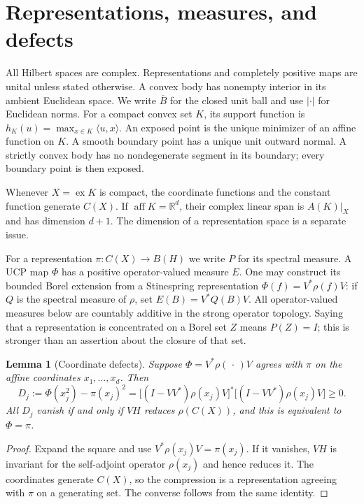 \documentclass[11pt,letterpaper]{amsart}
\newtheorem{lemma}[theorem]{Lemma}
\theoremstyle{definition}
\theoremstyle{remark}
\numberwithin{equation}{section}
\DeclareMathOperator{\ex}{ex}
\DeclareMathOperator{\aff}{aff}
\newcommand{\R}{\mathbb R}
\begin{document}
\section{Representations, measures, and defects}
\label{sec:preliminaries}

All Hilbert spaces are complex. Representations and completely positive
maps are unital unless stated otherwise. A convex body has nonempty
interior in its ambient Euclidean space. We write $\overline B$ for the
closed unit ball and use $|\cdot|$ for Euclidean norms. For a compact
convex set $K$, its support function is
$h_K(u)=\max_{x\in K}\langle u,x\rangle$. An exposed point is the
unique minimizer of an affine function on $K$. A smooth boundary point has a unique unit outward
normal. A strictly convex body has no nondegenerate segment in its
boundary; every boundary point is then exposed.

Whenever $X=\ex K$ is compact, the coordinate functions and the constant
function generate $C(X)$. If $\aff K=\R^d$, their complex linear span
is $A(K)|_X$ and has dimension $d+1$. The dimension of a representation
space is a separate issue.

For a representation $\pi:C(X)\to B(H)$ we write $P$ for its spectral
measure. A UCP map $\Phi$ has a positive operator-valued measure $E$.
One may construct its bounded Borel extension from a Stinespring
representation $\Phi(f)=V^*\rho(f)V$: if $Q$ is the spectral measure of
$\rho$, set $E(B)=V^*Q(B)V$. All operator-valued measures below are
countably additive in the strong operator topology. Saying that a
representation is concentrated on a Borel set $Z$ means $P(Z)=I$;
this is stronger than an assertion about the closure of that set.

\begin{lemma}[Coordinate defects]\label{lem:defect}
Suppose $\Phi=V^*\rho(\,\cdot\,)V$ agrees with $\pi$ on the affine
coordinates $x_1,\ldots,x_d$. Then
\[
 D_j:=\Phi(x_j^2)-\pi(x_j)^2
   =\bigl[(I-VV^*)\rho(x_j)V\bigr]^*
      \bigl[(I-VV^*)\rho(x_j)V\bigr]\ge0.
\]
All $D_j$ vanish if and only if $VH$ reduces $\rho(C(X))$, and this
is equivalent to $\Phi=\pi$.
\end{lemma}
\begin{proof}
Expand the square and use $V^*\rho(x_j)V=\pi(x_j)$.
If it vanishes, $VH$ is invariant for the self-adjoint operator
$\rho(x_j)$ and hence reduces it. The coordinates generate $C(X)$,
so the compression is a representation agreeing with $\pi$ on a
generating set. The converse follows from the same identity.
\end{proof}
\end{document}
